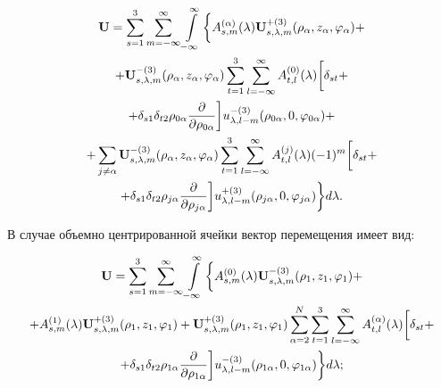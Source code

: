 \begin{russian}
\begin{multline}
{\bf{U}} = \sum\limits_{s = 1}^3 {\sum\limits_{m =  - \infty }^\infty  {\int\limits_{ - \infty }^\infty  \bigg\{  } } A_{s,m}^{(\alpha )}(\lambda ){\bf{U}}_{s,\lambda ,m}^{ + (3)}({\rho _\alpha },{z_\alpha },{\varphi _\alpha }) + \\
+ {\bf{U}}_{s,\lambda ,m}^{ - (3)}({\rho _\alpha },{z_\alpha },{\varphi _\alpha })\sum\limits_{t = 1}^3 {\sum\limits_{l =  - \infty }^\infty  {A_{t,l}^{(0)}} } (\lambda )\bigg[{\delta _{st}} + \\
+ {\delta _{s1}}{\delta _{t2}}{\rho _{0\alpha }}\frac{\partial }{{\partial {\rho _{0\alpha }}}}\bigg]u_{\lambda ,l - m}^{ - (3)}({\rho _{0\alpha }},0,{\varphi _{0\alpha }}) + \\
+ \sum\limits_{j \ne \alpha } {{\bf{U}}_{s,\lambda ,m}^{ - (3)}} ({\rho _\alpha },{z_\alpha },{\varphi _\alpha })\sum\limits_{t = 1}^3 {\sum\limits_{l =  - \infty }^\infty  {A_{t,l}^{(j)}} } (\lambda ){( - 1)^m}\bigg[{\delta _{st}} + \\
+ {\delta _{s1}}{\delta _{t2}}{\rho _{j\alpha }}\frac{\partial }{{\partial {\rho _{j\alpha }}}}\bigg]u_{\lambda ,l - m}^{ + (3)}({\rho _{j\alpha }},0,{\varphi _{j\alpha }})\bigg\} d\lambda.
\label{eq:7:14}
\end{multline}

В случае объемно центрированной ячейки вектор перемещения имеет вид:

\begin{multline}
{\bf{U}} = \sum\limits_{s = 1}^3 {\sum\limits_{m =  - \infty }^\infty  {\int\limits_{ - \infty }^\infty  \bigg\{  } } A_{s,m}^{(0)}(\lambda ){\bf{U}}_{s,\lambda ,m}^{ - (3)}({\rho _1},{z_1},{\varphi _1}) + \\
+ A_{s,m}^{(1)}(\lambda ){\bf{U}}_{s,\lambda ,m}^{ + (3)}({\rho _1},{z_1},{\varphi _1}) + {\bf{U}}_{s,\lambda ,m}^{ + (3)}({\rho _1},{z_1},{\varphi _1})\sum\limits_{\alpha  = 2}^N {\sum\limits_{t = 1}^3 {\sum\limits_{l =  - \infty }^\infty  {A_{t,l}^{(\alpha )}} } } (\lambda )\bigg[{\delta _{st}} + \\
+ {\delta _{s1}}{\delta _{t2}}{\rho _{1\alpha }}\frac{\partial }{{\partial {\rho _{1\alpha }}}}\bigg]u_{\lambda ,l - m}^{ - (3)}({\rho _{1\alpha }},0,{\varphi _{1\alpha }})\bigg\} d\lambda;
\label{eq:7:15}
\end{multline}


\end{russian}
